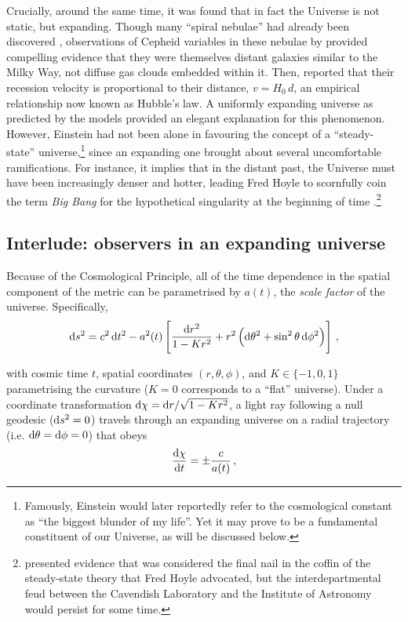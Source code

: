 Crucially, around the same time, it was found that in fact the Universe is not static, but expanding. Though many ``spiral nebulae'' had already been discovered \citep[e.g.][]{964AlSufi}, observations of Cepheid variables in these nebulae by \citet{1925ApJ....62..409H, 1926ApJ....63..236H} provided compelling evidence that they were themselves distant galaxies similar to the Milky Way, not diffuse gas clouds embedded within it. Then, \citet{1929PNAS...15..168H} reported that their recession velocity is proportional to their distance, $v = H_0 \, d$, an empirical relationship now known as Hubble's law. A uniformly expanding universe as predicted by the \citeauthor{1922ZPhy...10..377F} models provided an elegant explanation for this phenomenon. However, Einstein had not been alone in favouring the concept of a ``steady-state'' universe,\footnote{Famously, Einstein would later reportedly refer to the cosmological constant as ``the biggest blunder of my life''. Yet it may prove to be a fundamental constituent of our Universe, as will be discussed below.} since an expanding one brought about several uncomfortable ramifications. For instance, it implies that in the distant past, the Universe must have been increasingly denser and hotter, leading Fred Hoyle to scornfully coin the term \textit{Big Bang} for the hypothetical singularity at the beginning of time \citep[already considered by][]{1927PhDT.........6L}.\footnote{\citet{1961MNRAS.122..349R} presented evidence that was considered the final nail in the coffin of the steady-state theory that Fred Hoyle advocated, but the interdepartmental feud between the Cavendish Laboratory and the Institute of Astronomy would persist for some time.}

\subsection{Interlude: observers in an expanding universe}
\label{chIssec:Observers_in_an_expanding_universe}

Because of the Cosmological Principle, all of the time dependence in the spatial component of the metric can be parametrised by $a(t)$, the \textit{scale factor} of the universe. Specifically,
\begin{equation}
    \label{chIeq:FLRW_metric}
    \dif s^2 = c^2 \dif t^2 - a^2(t) \left[ \frac{\dif r^2}{1 - Kr^2} + r^2 \left( \dif \theta^2 + \sin^2 \theta \dif \phi^2 \right) \right] \, ,
\end{equation}

\noindent with cosmic time $t$, spatial coordinates $(r, \theta, \phi)$, and $K \in \{ -1, 0, 1 \}$ parametrising the curvature ($K = 0$ corresponds to a ``flat'' universe). Under a coordinate transformation $\dif \chi = \dif r / \sqrt{1 - Kr^2}$, a light ray following a null geodesic ($\dif s^2 = 0$) travels through an expanding universe on a radial trajectory (i.e. $\dif \theta = \dif \phi = 0$) that obeys
\begin{equation}
    \label{chIeq:Null_geodesic}
    \frac{\dif \chi}{\dif t} = \pm \frac{c}{a(t)} \, ,
\end{equation}

